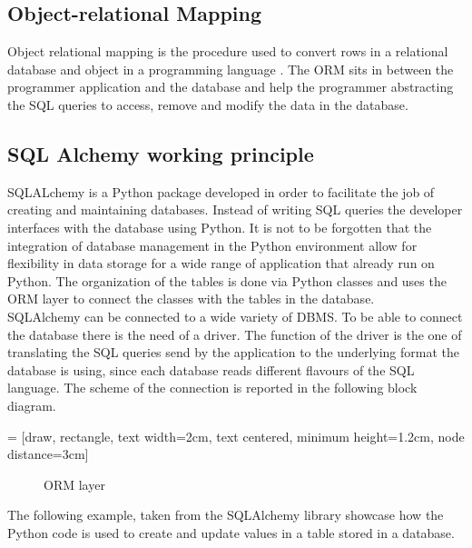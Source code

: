 \documentclass[../main.tex]{subfiles}
\begin{document}
\subsection{Object-relational Mapping}
Object relational mapping is the procedure used to convert rows in a relational database and object in a programming language \cite{10.1145/1376616.1376773}. The \gls{ORM} sits in between the programmer application and the database and help the programmer abstracting the SQL queries to access, remove and modify the data in the database. 
\subsection{SQL Alchemy working principle}
SQLALchemy is a Python package developed in order to facilitate the job of creating and maintaining databases. Instead of writing SQL queries the developer interfaces with the database using Python. It is not to be forgotten that the integration of database management in the Python environment allow for flexibility in data storage for a wide range of application that already run on Python. The organization of the tables is done via Python classes and uses the \gls{ORM} layer to connect the classes with the tables in the database.\\
SQLAlchemy can be connected to a wide variety of \gls{DBMS}. To be able to connect the database there is the need of a driver. The function of the driver is the one of translating the SQL queries send by the application to the underlying format the database is using, since each database reads different flavours of the SQL language. The scheme of the connection is reported in the following block diagram. 

 = [draw, rectangle, text width=2cm, text centered, minimum height=1.2cm, node distance=3cm]
\begin{figure}[h]
  \centering
{}
  \caption{ORM layer}
  \label{ormlayer}
\end{figure}
The following example, taken from the SQLAlchemy library showcase how the Python code is used to create and update values in a table stored in a database. 
\end{document}
